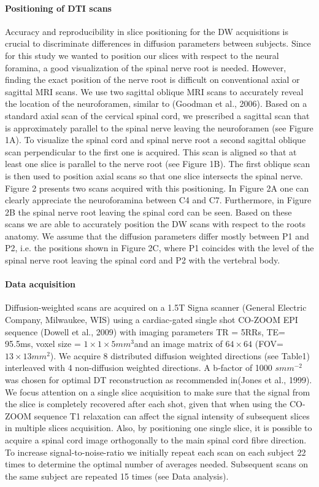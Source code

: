 \paragraph{Positioning of DTI scans} Accuracy and reproducibility in slice positioning for the DW acquisitions is crucial to discriminate differences in diffusion parameters between subjects. Since for this study we wanted to position our slices with respect to the neural foramina, a good visualization of the spinal nerve root is needed. However, finding the exact position of the nerve root is difficult on conventional axial or sagittal MRI scans. We use two sagittal oblique MRI scans to accurately reveal the location of the neuroforamen, similar to (Goodman et al., 2006). Based on a standard axial scan of the cervical spinal cord, we prescribed a sagittal scan that is approximately parallel to the spinal nerve leaving the neuroforamen (see Figure 1A). To visualize the spinal cord and spinal nerve root a second sagittal oblique scan perpendicular to the first one is acquired. This scan is aligned so that at least one slice is parallel to the nerve root (see Figure 1B). The first oblique scan is then used to position axial scans so that one slice intersects the spinal nerve. Figure 2 presents two scans acquired with this positioning. In Figure 2A one can clearly appreciate the neuroforamina between C4 and C7. Furthermore, in Figure 2B the spinal nerve root leaving the spinal cord can be seen. Based on these scans we are able to accurately position the DW scans with respect to the roots anatomy. We assume that the diffusion parameters differ mostly between P1 and P2, i.e. the positions shown in Figure 2C, where P1 coincides with the level of the spinal nerve root leaving the spinal cord and P2 with the vertebral body.

\paragraph{Data acquisition}
Diffusion-weighted scans are acquired on a 1.5T Signa scanner (General Electric Company, Milwaukee, WIS) using a cardiac-gated single shot CO-ZOOM EPI sequence (Dowell et al., 2009) with imaging parameters TR = 5RRs, TE= 95.5ms, voxel size = $1\times 1 \times 5mm^3$and an image matrix of $64\times 64$ (FOV=$13\times 13mm^2$). We acquire 8 distributed diffusion weighted directions (see Table1) interleaved with 4 non-diffusion weighted directions. A b-factor of 1000 $smm^{-2}$ was chosen for optimal DT reconstruction as recommended in(Jones et al., 1999). We focus attention on a single slice acquisition to make sure that the signal from the slice is completely recovered after each shot, given that when using the CO-ZOOM sequence T1 relaxation can affect the signal intensity of subsequent slices in multiple slices acquisition. Also, by positioning one single slice, it is possible to acquire a spinal cord image orthogonally to the main spinal cord fibre direction. To increase signal-to-noise-ratio we initially repeat each scan on each subject 22 times to determine the optimal number of averages needed. Subsequent scans on the same subject are repeated 15 times (see Data analysis). 

